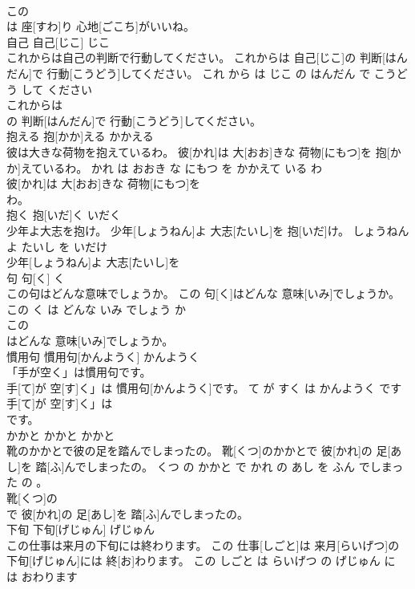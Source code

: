 \documentclass[8pt]{extreport}
\begin{document}
\begin{CJK}{UTF8}{min}
\\	この
\\	は 座[すわ]り 心地[ごこち]がいいね。			
\\	自己	自己[じこ]	じこ	
\\	これからは自己の判断で行動してください。	これからは 自己[じこ]の 判断[はんだん]で 行動[こうどう]してください。	これ から は じこ の はんだん で こうどう して ください	
\\	これからは
\\	の 判断[はんだん]で 行動[こうどう]してください。			
\\	抱える	抱[かか]える	かかえる	
\\	彼は大きな荷物を抱えているわ。	彼[かれ]は 大[おお]きな 荷物[にもつ]を 抱[かか]えているわ。	かれ は おおき な にもつ を かかえて いる わ	
\\	彼[かれ]は 大[おお]きな 荷物[にもつ]を
\\	わ。			
\\	抱く	抱[いだ]く	いだく	
\\	少年よ大志を抱け。	少年[しょうねん]よ 大志[たいし]を 抱[いだ]け。	しょうねん よ たいし を いだけ	
\\	少年[しょうねん]よ 大志[たいし]を
\\	句	句[く]	く	
\\	この句はどんな意味でしょうか。	この 句[く]はどんな 意味[いみ]でしょうか。	この く は どんな いみ でしょう か	
\\	この
\\	はどんな 意味[いみ]でしょうか。			
\\	慣用句	慣用句[かんようく]	かんようく	
\\	「手が空く」は慣用句です。	
\\	手[て]が 空[す]く」は 慣用句[かんようく]です。	て が すく は かんようく です	
\\	手[て]が 空[す]く」は
\\	です。			
\\	かかと	かかと	かかと	
\\	靴のかかとで彼の足を踏んでしまったの。	靴[くつ]のかかとで 彼[かれ]の 足[あし]を 踏[ふ]んでしまったの。	くつ の かかと で かれ の あし を ふん でしまった の 。	
\\	靴[くつ]の
\\	で 彼[かれ]の 足[あし]を 踏[ふ]んでしまったの。			
\\	下旬	下旬[げじゅん]	げじゅん	
\\	この仕事は来月の下旬には終わります。	この 仕事[しごと]は 来月[らいげつ]の 下旬[げじゅん]には 終[お]わります。	この しごと は らいげつ の げじゅん に は おわります	

\end{CJK}
\end{document}
